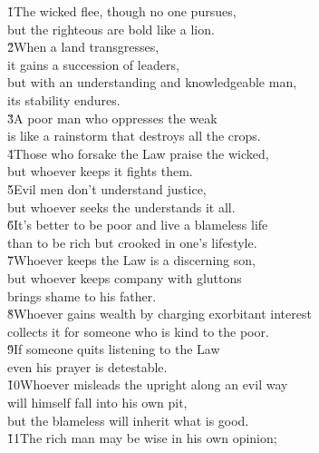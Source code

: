\begin{poetry}
\poeml {}
\v{1}The wicked flee, though no one pursues, \\
\poeml but the righteous are bold like a lion. \\
\poeml \v{2}When a land transgresses, \\
\poemll    it gains a succession of leaders, \\
\poeml but with an understanding and knowledgeable man, \\
\poemll    its stability endures. \\
\poeml \v{3}A poor man who oppresses the weak \\
\poemll    is like a rainstorm that destroys all the crops. \\
\poeml \v{4}Those who forsake the Law praise the wicked, \\
\poemll    but whoever keeps it fights them. \\
\poeml \v{5}Evil men don't understand justice, \\
\poemll    but whoever seeks the  understands it all. \\
\poeml \v{6}It's better to be poor and live a blameless life \\
\poemll    than to be rich but crooked in one's lifestyle. \\
\poeml \v{7}Whoever keeps the Law is a discerning son, \\
\poemll    but whoever keeps company with gluttons \\
\poemlll       brings shame to his father. \\
\poeml \v{8}Whoever gains wealth by charging exorbitant interest \\
\poemll    collects it for someone who is kind to the poor. \\
\poeml \v{9}If someone quits listening to the Law \\
\poemll    even his prayer is detestable. \\
\poeml \v{10}Whoever misleads the upright along an evil way \\
\poemll    will himself fall into his own pit, \\
\poemlll       but the blameless will inherit what is good. \\
\poeml \v{11}The rich man may be wise in his own opinion; \\

\end{poetry}
